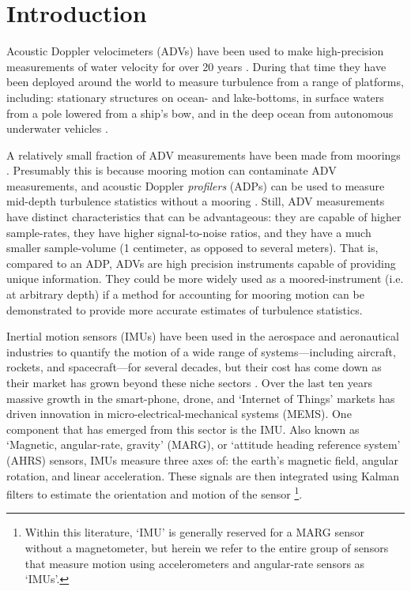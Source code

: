 
\section{Introduction}

Acoustic Doppler velocimeters (ADVs) have been used to make high-precision measurements of water velocity for over 20 years \cite[]{Kraus++1994, Lohrmann++1995}.  During that time they have been deployed around the world to measure turbulence from a range of platforms, including: stationary structures on ocean- and lake-bottoms, in surface waters from a pole lowered from a ship's bow, and in the deep ocean from autonomous underwater vehicles \cite[e.g.][]{Voulgaris+Trowbridge1998, Zhang++2001, Kim++2000, Goodman++2006, Lorke2007, Geyer++2008, Cartwright++2009}. 


A relatively small fraction of ADV measurements have been made from moorings \cite[e.g.][]{Fer+Paskyabi2014}. Presumably this is because mooring motion can contaminate ADV measurements, and acoustic Doppler {\it profilers} (ADPs) can be used to measure mid-depth turbulence statistics without a mooring \cite[e.g.][]{Stacey++1999a, Rippeth++2002, Wiles++2006}. Still, ADV measurements have distinct characteristics that can be advantageous: they are capable of higher sample-rates, they have higher signal-to-noise ratios, and they have a much smaller sample-volume (1 centimeter, as opposed to several meters). That is, compared to an ADP, ADVs are high precision instruments capable of providing unique information. They could be more widely used as a moored-instrument (i.e. at arbitrary depth) if a method for accounting for mooring motion can be demonstrated to provide more accurate estimates of turbulence statistics.

Inertial motion sensors (IMUs) have been used in the aerospace and aeronautical industries to quantify the motion of a wide range of systems---including aircraft, rockets, and spacecraft---for several decades, but their cost has come down as their market has grown beyond these niche sectors \cite[]{Bevly2004}. Over the last ten years massive growth in the smart-phone, drone, and `Internet of Things' markets has driven innovation in micro-electrical-mechanical systems (MEMS). One component that has emerged from this sector is the IMU. Also known as `Magnetic, angular-rate, gravity' (MARG), or `attitude heading reference system' (AHRS) sensors, IMUs measure three axes of: the earth's magnetic field, angular rotation, and linear acceleration. These signals are then integrated using Kalman filters to estimate the orientation and motion of the sensor \cite[]{Barshan+Whyte1995, Marins++2001, Bachmann++2003}\footnote{Within this literature, `IMU' is generally reserved for a MARG sensor without a magnetometer, but herein we refer to the entire group of sensors that measure motion using accelerometers and angular-rate sensors as `IMUs'.}.


